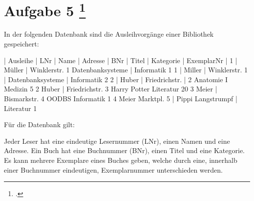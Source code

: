 \documentclass{lehramt-informatik-aufgabe}
\begin{document}
\let\ah=\liAttributHuelle
\let\ahL=\liAttributHuelleLinksReduktion
\let\FA=\liFunktionaleAbhaengigkeiten
\let\fa=\liFunktionaleAbhaengigkeit
\let\m=\liAttributMenge
\let\schrittE=\liSyntheseSchrittUeberschriftErklaerung

\section{Aufgabe 5
\footcite{66116:2017:03}}

In der folgenden Datenbank sind die Ausleihvorgänge einer Bibliothek gespeichert:

| Ausleihe | LNr | Name | Adresse | BNr | Titel | Kategorie | ExemplarNr |
1 | Müller | Winklerstr. 1 Datenbanksysteme | Informatik 1
1 | Miller | Winklerstr. 1 | Datenbanksysteme | Informatik 2
2 | Huber | Friedrichstr. | 2 Anatomie I Medizin 5
2 Huber | Friedrichstr. 3 Harry Potter Literatur 20
3 Meier | Bismarkstr. 4 OODBS Informatik 1
4 Meier Marktpl. 5 | Pippi Langstrumpf | Literatur 1

Für die Datenbank gilt:

Jeder Leser hat eine eindeutige Lesernummer (LNr), einen Namen und eine
Adresse. Ein Buch hat eine Buchnummer (BNr), einen Titel und eine
Kategorie. Es kann mehrere Exemplare eines Buches geben, welche durch
eine, innerhalb einer Buchnummer eindeutigen, Exemplarnummer
unterschieden werden.
\end{document}

